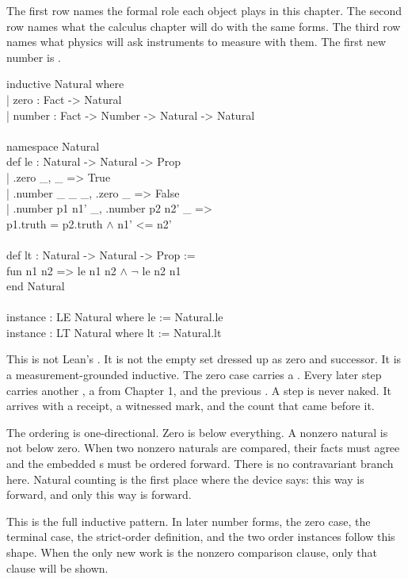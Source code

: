 The first row names the formal role each object plays in this chapter. The
second row names what the calculus chapter will do with the same forms. The
third row names what physics will ask instruments to measure with them. The
first new number is .

\begin{leancode}
inductive Natural where\\
\quad | zero : Fact -> Natural\\
\quad | number : Fact -> Number -> Natural -> Natural\\
\\
namespace Natural\\
def le : Natural -> Natural -> Prop\\
\quad | .zero \_, \_ => True\\
\quad | .number \_ \_ \_, .zero \_ => False\\
\quad | .number p1 n1' \_, .number p2 n2' \_ =>\\
\quad\quad p1.truth = p2.truth \(\wedge\) n1' <= n2'\\
\\
def lt : Natural -> Natural -> Prop :=\\
\quad fun n1 n2 => le n1 n2 \(\wedge\) \(\neg\) le n2 n1\\
end Natural\\
\\
instance : LE Natural where le := Natural.le\\
instance : LT Natural where lt := Natural.lt
\end{leancode}

This is not Lean's . It is not the empty set dressed up as zero and
successor. It is a measurement-grounded inductive. The zero case carries a
. Every later step carries another , a  from
Chapter 1, and the previous . A step is never naked. It arrives
with a receipt, a witnessed mark, and the count that came before it.

The ordering is one-directional. Zero is below everything. A nonzero natural is
not below zero. When two nonzero naturals are compared, their facts must agree
and the embedded s must be ordered forward. There is no
contravariant branch here. Natural counting is the first place where the device
says: this way is forward, and only this way is forward.

This is the full inductive pattern. In later number forms, the zero case, the
terminal case, the strict-order definition, and the two order instances follow
this shape. When the only new work is the nonzero comparison clause, only that
clause will be shown.

